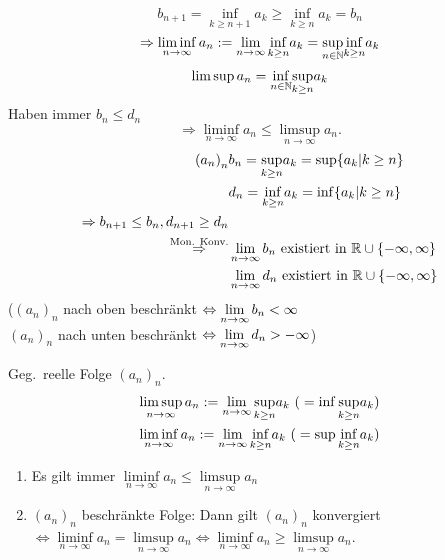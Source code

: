 \documentclass[../ana1.tex]{subfiles}
\begin{document}
\[ b_{n+1} = \underset{k\geq n+1}{\inf} a_k \geq \underset{k\geq n}{\inf} a_k = b_n \]
\[ \Rightarrow \liminf\limits_{n\rightarrow\infty} a_n := \lim\limits_{n\rightarrow\infty} \underset{k\geq n}{\inf} a_k = \underset{n\in\mathbb{N}}{\sup} \underset{k\geq n}{\inf} a_k \]
\[ \limsup a_n = \underset{n\in\mathbb{N}}{\inf} \underset{k\geq n}{\sup} a_k \]
Haben immer \(b_n \leq d_n\)
\[ \Rightarrow \liminf\limits_{n\rightarrow\infty} a_n \leq \limsup\limits_{n\rightarrow\infty} a_n. \]
\begin{align*}
	{(a_n)}_n &b_n = \underset{k\geq n}{\sup} a_k = \sup \{ a_k | k\geq n \} \\
	&d_n = \underset{k\geq n}{\inf} a_k = \inf \{ a_k | k\geq n \} \\
	\Rightarrow b_{n+1} \leq b_n, d_{n+1} \geq d_n\\
	\overset{\text{Mon. Konv.}}{\Rightarrow} &\lim\limits_{n\rightarrow\infty} b_n \text{ existiert in }\mathbb{R} \cup \{-\infty, \infty \} \\
	&\lim\limits_{n\rightarrow\infty} d_n \text{ existiert in }\mathbb{R} \cup \{-\infty, \infty \}
\end{align*}
(\({(a_n)}_n\) nach oben beschränkt \(\Leftrightarrow \lim\limits_{n\rightarrow\infty} b_n < \infty \) \\
\({(a_n)}_n\) nach unten beschränkt \(\Leftrightarrow \lim\limits_{n\rightarrow\infty} d_n > -\infty \))
\begin{defi}
	Geg.\ reelle Folge \({(a_n)}_n\).
	\begin{align*}
		\limsup\limits_{n\rightarrow\infty} a_n := \lim\limits_{n\rightarrow\infty}\underset{k\geq n}{\sup} a_k \text{ (}=\inf\underset{k\geq{}n}{\sup}a_k \text{)}\\
		\liminf\limits_{n\rightarrow\infty} a_n := \lim\limits_{n\rightarrow\infty}\underset{k\geq n}{\inf} a_k \text{ (}=\sup\underset{k\geq{}n}{\inf}a_k \text{)}
	\end{align*}
\end{defi}
\begin{lem}
	\begin{enumerate}
		\item Es gilt immer \( \liminf\limits_{n\rightarrow\infty}a_n \leq \limsup\limits_{n\rightarrow\infty}a_n \)
		\item \({(a_n)}_n\) beschränkte Folge: Dann gilt \({(a_n)}_n\) konvergiert \( \Leftrightarrow \liminf\limits_{n\rightarrow\infty}a_n = \limsup\limits_{n\rightarrow\infty}a_n \Leftrightarrow \liminf\limits_{n\rightarrow\infty}a_n \geq \limsup\limits_{n\rightarrow\infty}a_n \).
	\end{enumerate}
\end{lem}
\end{document}
